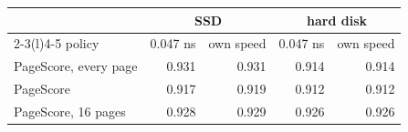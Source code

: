 \begin{tabular}{lrrrr}
\toprule
 & \multicolumn{2}{c}{SSD} & \multicolumn{2}{c}{hard disk} \\
\cmidrule(lr){2-3}\cmidrule(l){4-5}
policy & 0.047 ns & own speed & 0.047 ns & own speed \\
\midrule
PageScore, every page & 0.931 & 0.931 & 0.914 & 0.914 \\
PageScore & 0.917 & 0.919 & 0.912 & 0.912 \\
PageScore, 16 pages & 0.928 & 0.929 & 0.926 & 0.926 \\
\bottomrule
\end{tabular}
